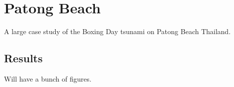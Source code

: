 
\section{Patong Beach}

A large case study of the Boxing Day tsunami on Patong Beach Thailand. 

\subsection{Results}


Will have a bunch of figures.




\endinput